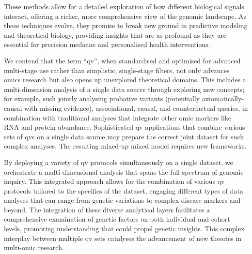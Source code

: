 
These methods allow for a detailed exploration of how different biological signals interact, offering a richer, more comprehensive view of the genomic landscape. 
As these techniques evolve, they promise to break new ground in predictive modeling and theoretical biology, providing insights that are as profound as they are essential for precision medicine and personalised health interventions.

We contend that the term ``\ac{qv}'', when standardised and optimised for advanced multi-stage use rather than simplistic, single-stage filters, not only advances omics research but also opens up unexplored theoretical domains. 
This includes a multi-dimension analysis of a single data source through exploring new concepts; for example, such jointly analysing probative variants (potentially axiomatically-causal with missing evidence), 
associational, causal, and counterfactual queries, in combination with traditional analyses that integrate other omic markers like RNA and protein abundance.
Sophisticated \ac{qv} applications that combine various sets of \ac{qv}s on a single data source may prepare the correct joint dataset for such complex analyses.
The resulting mixed-up mixed model requires new frameworks.

By deploying a variety of \ac{qv} protocols simultaneously on a single dataset, we orchestrate a multi-dimensional analysis that spans the full spectrum of genomic inquiry. This integrated approach allows for the combination of various \ac{qv} protocols tailored to the specifics of the dataset, engaging different types of data analyses that can range from genetic variations to complex disease markers and beyond. 
The integration of these diverse analytical layers facilitates a comprehensive examination of genetic factors on both individual and cohort levels, promoting understanding that could propel genetic insights. This complex interplay between multiple \ac{qv} sets catalyses the advancement of new theories in multi-omic research.

